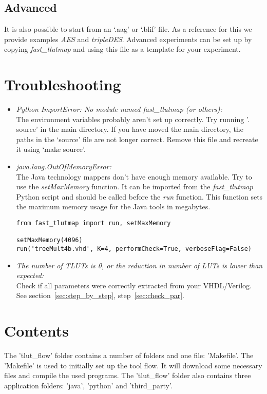 \documentclass[a4paper,oneside]{memoir}
\begin{document}
\section{Advanced}
It is also possible to start from an `.aag' or `.blif' file. As a reference for this we provide examples \emph{AES} and \emph{tripleDES}. 
Advanced experiments can be set up by copying \emph{fast\_tlutmap} and using this file as a template for your experiment.

\clearpage
\chapter{Troubleshooting}\label{sec:troubleshooting}
\begin{itemize}
\item \emph{Python ImportError: No module named fast\_tlutmap (or others):}\\
The environment variables probably aren't set up correctly. Try running '. source' in the main directory. 
If you have moved the main directory, the paths in the `source' file are not longer correct. Remove this file and recreate it using `make source'.

\item \emph{java.lang.OutOfMemoryError:}\\
The Java technology mappers don't have enough memory available. Try to use the \emph{setMaxMemory} function. It can be imported from the \emph{fast\_tlutmap} Python script and should be called before the \emph{run} function. This function sets the maximum memory usage for the Java tools in megabytes.
\lstset{language=python}
\begin{lstlisting}
from fast_tlutmap import run, setMaxMemory

setMaxMemory(4096)
run('treeMult4b.vhd', K=4, performCheck=True, verboseFlag=False)
\end{lstlisting}

\item \emph{The number of TLUTs is 0, or the reduction in number of LUTs is lower than expected:}\\
Check if all parameters were correctly extracted from your VHDL/Verilog. See section~\ref{sec:step_by_step}, step~\ref{sec:check_par}.
\end{itemize}

\clearpage
\chapter{Contents}\label{sec:contents}
The 'tlut\_flow' folder contains a number of folders and one file: 'Makefile'. The 'Makefile' is used to initially set up the tool flow. It will download some necessary files and compile the used programs.
The 'tlut\_flow' folder also contains three application folders: 'java', 'python' and 'third\_party'.
\end{document}
